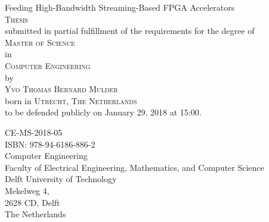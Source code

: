 \thispagestyle{empty}
\begin{vplace}
    
\centering
{\LARGE Feeding High-Bandwidth Streaming-Based FPGA Accelerators}
\\[4em]
{\large
\textsc{Thesis} \\[1.5em]
submitted in partial fulfillment of the requirements for the degree of \\[1em]
\textsc{Master of Science}
\\[1em]
in
\\[1em]
\textsc{Computer Engineering}
\\[1em]
by
\\[1em]
\textsc{Yvo Thomas Bernard Mulder}\\[0.5em]
born in \textsc{Utrecht, The Netherlands}
\\[1em]
to be defended publicly on January 29, 2018 at 15:00.
}
\end{vplace}
\vfill
\begin{flushleft}
\noindent
CE-MS-2018-05\\
ISBN: 978-94-6186-886-2\\
Computer Engineering\\
Faculty of Electrical Engineering, Mathematics, and Computer Science\\
Delft University of Technology\\
Mekelweg 4,\\
2628 CD, Delft\\
The Netherlands \\
\end{flushleft}
